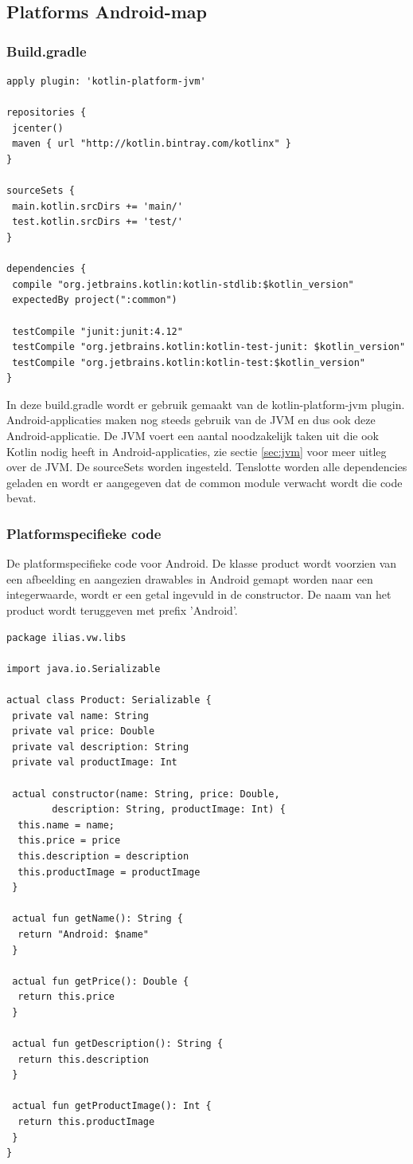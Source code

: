 \subsection{Platforms Android-map}
\subsubsection{Build.gradle}
\begin{lstlisting}
apply plugin: 'kotlin-platform-jvm'

repositories {
 jcenter()
 maven { url "http://kotlin.bintray.com/kotlinx" }
}

sourceSets {
 main.kotlin.srcDirs += 'main/'
 test.kotlin.srcDirs += 'test/'
}

dependencies {
 compile "org.jetbrains.kotlin:kotlin-stdlib:$kotlin_version"
 expectedBy project(":common")

 testCompile "junit:junit:4.12"
 testCompile "org.jetbrains.kotlin:kotlin-test-junit: $kotlin_version"
 testCompile "org.jetbrains.kotlin:kotlin-test:$kotlin_version"
}
\end{lstlisting}

In deze build.gradle wordt er gebruik gemaakt van de kotlin-platform-jvm plugin. Android-applicaties maken nog steeds gebruik van de JVM en dus ook deze Android-applicatie. De JVM voert een aantal noodzakelijk taken uit die ook Kotlin nodig heeft in Android-applicaties, zie sectie \ref{sec:jvm} voor meer uitleg over de JVM. De sourceSets worden ingesteld. Tenslotte worden alle dependencies geladen en wordt er aangegeven dat de common module verwacht wordt die code bevat.

\subsubsection{Platformspecifieke code}
De platformspecifieke code voor Android. De klasse product wordt voorzien van een afbeelding en aangezien drawables in Android gemapt worden naar een integerwaarde, wordt er een getal ingevuld in de constructor. De naam van het product wordt teruggeven met prefix 'Android'.
\begin{lstlisting}
package ilias.vw.libs

import java.io.Serializable

actual class Product: Serializable {
 private val name: String
 private val price: Double
 private val description: String
 private val productImage: Int

 actual constructor(name: String, price: Double, 
		description: String, productImage: Int) {
  this.name = name;
  this.price = price
  this.description = description
  this.productImage = productImage
 }

 actual fun getName(): String {
  return "Android: $name"
 }

 actual fun getPrice(): Double {
  return this.price
 }

 actual fun getDescription(): String {
  return this.description
 }

 actual fun getProductImage(): Int {
  return this.productImage
 }
}
\end{lstlisting}

